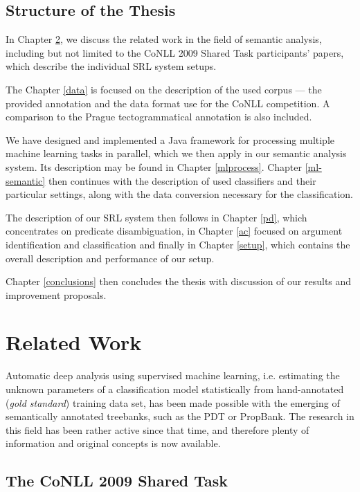 \documentclass[12pt,notitlepage]{report}
\begin{document}
\section{Structure of the Thesis}

In Chapter \ref{related}, we discuss the related work in the field of semantic analysis, including but not limited to the CoNLL 2009 Shared Task participants' papers, which describe the individual SRL system setups.

The Chapter \ref{data} is focused on the description of the used corpus --- the provided annotation and the data format use for the CoNLL competition. A comparison to the Prague tectogrammatical annotation \citep{cinkova09} is also included.

We have designed and implemented a Java framework for processing multiple machine learning tasks in parallel, which we then apply in our semantic analysis system. Its description may be found in Chapter \ref{mlprocess}. Chapter \ref{ml-semantic} then continues with the description of used classifiers and their particular settings, along with the data conversion necessary for the classification.

The description of our SRL system then follows in Chapter \ref{pd}, which concentrates on predicate disambiguation, in Chapter \ref{ac} focused on argument identification and classification and finally in Chapter \ref{setup}, which contains the overall description and performance of our setup.

Chapter \ref{conclusions} then concludes the thesis with discussion of our results and improvement proposals.

\chapter{Related Work}\label{related}

Automatic deep analysis using supervised machine learning, i.e. estimating the unknown parameters of a classification model statistically from hand-annotated (\emph{gold standard}) training data set, has been made possible with the emerging of semantically annotated treebanks, such as the PDT or PropBank. The research in this field has been rather active since that time, and therefore plenty of information and original concepts is now available. 

\section{The CoNLL 2009 Shared Task}\label{conll2009}
\end{document}
